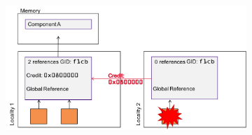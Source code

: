 \begin{figure}
\begin{subfigure}{0.4\textwidth}
        \caption{}
    \end{subfigure}
    \vspace{1em}
    \begin{subfigure}{0.4\textwidth}
        \includegraphics[width=\textwidth]{illustrations/reference_counting_4}
        \caption{}
    \end{subfigure}
    \caption{}
    
\end{figure}


